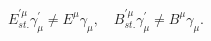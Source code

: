 \begin{equation}
E_{st.}^{\prime \mu }\gamma _{\mu }^{\prime }\neq E^{\mu }\gamma _{\mu
},\quad B_{st.}^{\prime \mu }\gamma _{\mu }^{\prime }\neq B^{\mu }\gamma
_{\mu }.  \label{krive}
\end{equation}

